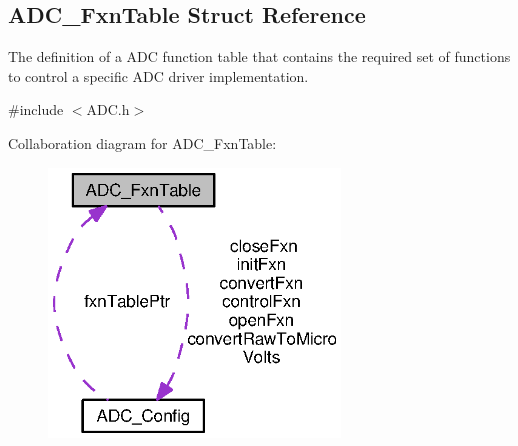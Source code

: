 \subsection{A\+D\+C\+\_\+\+Fxn\+Table Struct Reference}
\label{struct_a_d_c___fxn_table}


The definition of a A\+D\+C function table that contains the required set of functions to control a specific A\+D\+C driver implementation.  




{\ttfamily \#include $<$A\+D\+C.\+h$>$}



Collaboration diagram for A\+D\+C\+\_\+\+Fxn\+Table\+:
\nopagebreak
\begin{figure}[H]
\begin{center}
\leavevmode
\includegraphics[width=220pt]{struct_a_d_c___fxn_table__coll__graph}
\end{center}
\end{figure}
